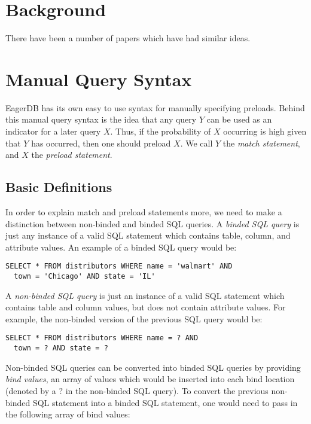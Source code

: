 \documentclass[12pt]{article}
\begin{document}
\section{Background}

There have been a number of papers which have had similar ideas.


\section{Manual Query Syntax}

EagerDB has its own easy to use syntax for manually specifying preloads. Behind this manual query syntax is the idea that any query $Y$ can be used as an indicator for a later query $X$. Thus, if the probability of $X$ occurring is high given that $Y$ has occurred, then one should preload $X$. We call $Y$ the \emph{match statement}, and $X$ the \emph{preload statement}.

\subsection{Basic Definitions}

In order to explain match and preload statements more, we need to make a distinction between non-binded and binded SQL queries. A \emph{binded SQL query} is just any instance of a valid SQL statement which contains table, column, and attribute values. An example of a binded SQL query would be:

\begin{lstlisting}
SELECT * FROM distributors WHERE name = 'walmart' AND
  town = 'Chicago' AND state = 'IL'
\end{lstlisting}

A \emph{non-binded SQL query} is just an instance of a valid SQL statement which contains table and column values, but does not contain attribute values. For example, the non-binded version of the previous SQL query would be:

\begin{lstlisting}
SELECT * FROM distributors WHERE name = ? AND
  town = ? AND state = ?
\end{lstlisting}

Non-binded SQL queries can be converted into binded SQL queries by providing \emph{bind values}, an array of values which would be inserted into each bind location (denoted by a $?$ in the non-binded SQL query). To convert the previous non-binded SQL statement into a binded SQL statement, one would need to pass in the following array of bind values:
\end{document}
